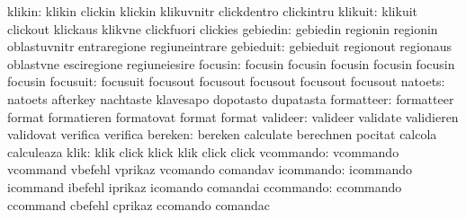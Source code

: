                    klikin: klikin                    clickin
                           klickin                   klikuvnitr
                           clickdentro               clickintru
                  klikuit: klikuit                   clickout
                           klickaus                  klikvne
                           clickfuori                clickies
                 gebiedin: gebiedin                  regionin
                           regionin                  oblastuvnitr
                           entraregione              regiuneintrare
                gebieduit: gebieduit                 regionout
                           regionaus                 oblastvne
                           esciregione               regiuneiesire
                  focusin: focusin                   focusin
                           focusin                   focusin
                           focusin                   focusin
                 focusuit: focusuit                  focusout
                           focusout                  focusout
                           focusout                  focusout
                  natoets: natoets                   afterkey
                           nachtaste                 klavesapo
                           dopotasto                 dupatasta
               formatteer: formatteer                format
                           formatieren               formatovat
                           format                    format %
                 valideer: valideer                  validate
                           validieren                validovat
                           verifica                  verifica
                  bereken: bereken                   calculate
                           berechnen                 pocitat
                           calcola                   calculeaza
                     klik: klik                      click
                           klick                     klik
                           click                     click
                vcommando: vcommando                 vcommand
                           vbefehl                   vprikaz
                           vcomando                  comandav
                icommando: icommando                 icommand
                           ibefehl                   iprikaz
                           icomando                  comandai
                ccommando: ccommando                 ccommand
                           cbefehl                   cprikaz
                           ccomando                  comandac


